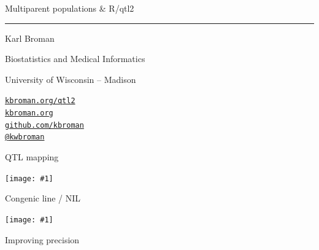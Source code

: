 \documentclass[12pt]{article}
\newcommand{\titlesize}{\fontsize{40}{50} \selectfont}
\newcommand{\headsize}{\fontsize{35}{35} \selectfont}
\newcommand{\textsize}{\fontsize{30}{35} \selectfont}
\newcommand{\smallsize}{\fontsize{25}{30} \selectfont}
\newcommand{\figh}[2]{\centerline{\texttt{[image: \#1]}}}
\newcommand{\figw}[2]{\centerline{\texttt{[image: \#1]}}}
\begin{document}
\thispagestyle{empty}

\begin{center}
\titlesize \color{myyellow}


\vspace*{15mm}

Multiparent populations \& R/qtl2

\color{mypink}
\rule{10in}{1mm}

\vspace{5mm}

\textsize \color{myblue}
Karl Broman
\vspace{5mm}

\color{mywhite}
{\smallsize Biostatistics and Medical Informatics

University of Wisconsin -- Madison
\vspace{20mm}


\href{http://kbroman.org/qtl2}{\tt kbroman.org/qtl2} \\[3pt]
\href{http://kbroman.org}{\tt kbroman.org} \\[3pt]
\href{https://github.com/kbroman}{\tt github.com/kbroman} \\
\href{https://twitter.com/kwbroman}{\tt @kwbroman} \\
}

\end{center}



\newpage


\headsize \color{myyellow}
\hfill \begin{minipage}{5.75in}
\centering
QTL mapping
\end{minipage}

\vspace{5mm}

\figh{Figs/lodcurve_insulin_with_effects.pdf}{0.9}

\newpage


\headsize \color{myyellow}
\hfill \begin{minipage}{5.75in}
\centering
Congenic line / NIL
\end{minipage}


\figw{Figs/congenic.pdf}{1.0}

\newpage



\headsize \color{myyellow}
\hfill \begin{minipage}{5.75in}
\centering
Improving precision
\end{minipage}


\vspace{3cm}
\end{document}
